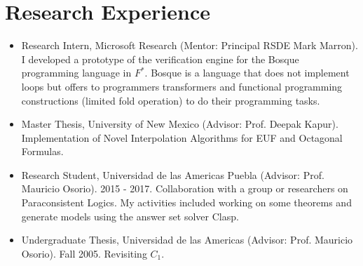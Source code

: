 \section{Research Experience}

\begin{itemize}
\item Research Intern, Microsoft Research (Mentor: Principal RSDE Mark Marron).
  I developed a prototype of the verification engine for the Bosque programming language in $F^{*}$.
  Bosque is a language that does not implement loops but offers to programmers transformers
  and functional programming constructions (limited fold operation) to do their programming tasks.
\item Master Thesis, University of New Mexico (Advisor: Prof. Deepak Kapur).
  Implementation of Novel Interpolation Algorithms for EUF and Octagonal Formulas.
\item Research Student, Universidad de las Americas Puebla (Advisor: Prof. Mauricio
  Osorio). 2015 - 2017. Collaboration with a group or researchers on Paraconsistent
  Logics. My activities included working on some theorems and generate models using
  the answer set solver Clasp.
\item Undergraduate Thesis, Universidad de las Americas (Advisor: Prof.
  Mauricio Osorio). Fall 2005. Revisiting $C_1$.
\end{itemize}

